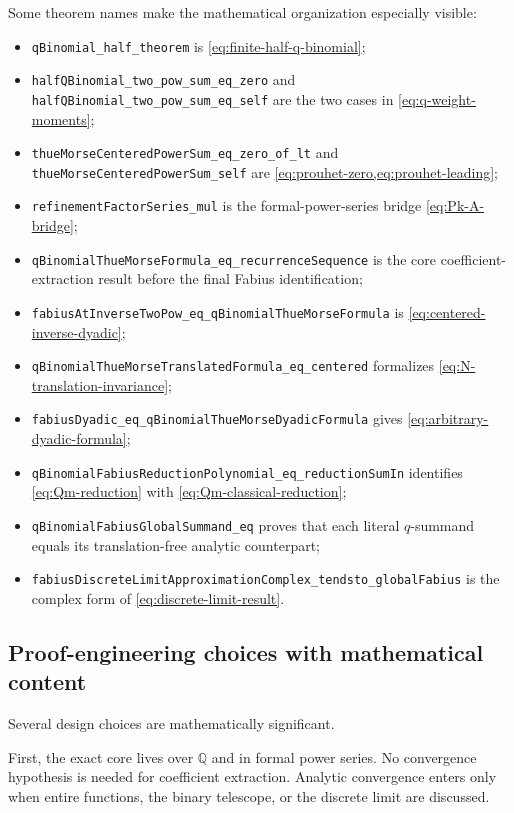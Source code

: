 \documentclass[11pt]{article}
\theoremstyle{definition}
\newcommand{\Q}{\mathbb{Q}}
\newcommand{\lean}[1]{\nolinkurl{#1}}
\begin{document}
Some theorem names make the mathematical organization especially visible:
\begin{itemize}[leftmargin=2em]
  \item \lean{qBinomial_half_theorem} is \cref{eq:finite-half-q-binomial};
  \item \lean{halfQBinomial_two_pow_sum_eq_zero} and \lean{halfQBinomial_two_pow_sum_eq_self} are the two cases in \cref{eq:q-weight-moments};
  \item \lean{thueMorseCenteredPowerSum_eq_zero_of_lt} and \lean{thueMorseCenteredPowerSum_self} are \cref{eq:prouhet-zero,eq:prouhet-leading};
  \item \lean{refinementFactorSeries_mul} is the formal-power-series bridge \cref{eq:Pk-A-bridge};
  \item \lean{qBinomialThueMorseFormula_eq_recurrenceSequence} is the core coefficient-extraction result before the final Fabius identification;
  \item \lean{fabiusAtInverseTwoPow_eq_qBinomialThueMorseFormula} is \cref{eq:centered-inverse-dyadic};
  \item \lean{qBinomialThueMorseTranslatedFormula_eq_centered} formalizes \cref{eq:N-translation-invariance};
  \item \lean{fabiusDyadic_eq_qBinomialThueMorseDyadicFormula} gives \cref{eq:arbitrary-dyadic-formula};
  \item \lean{qBinomialFabiusReductionPolynomial_eq_reductionSumIn} identifies \cref{eq:Qm-reduction} with \cref{eq:Qm-classical-reduction};
  \item \lean{qBinomialFabiusGlobalSummand_eq} proves that each literal $q$-summand equals its translation-free analytic counterpart;
  \item \lean{fabiusDiscreteLimitApproximationComplex_tendsto_globalFabius} is the complex form of \cref{eq:discrete-limit-result}.
\end{itemize}

\subsection{Proof-engineering choices with mathematical content}

Several design choices are mathematically significant.

First, the exact core lives over $\Q$ and in formal power series.  No convergence hypothesis is needed for coefficient extraction.  Analytic convergence enters only when entire functions, the binary telescope, or the discrete limit are discussed.
\end{document}
